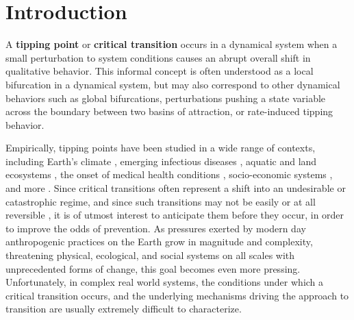 \section{Introduction}
\label{sec:intro}

A \textbf{tipping point} or \textbf{critical transition} occurs in a dynamical system when a small perturbation to system conditions causes an abrupt overall shift in qualitative behavior. This informal concept is often understood as a local bifurcation in a dynamical system, but may also correspond to other dynamical behaviors such as global bifurcations, perturbations pushing a state variable across the boundary between two basins of attraction, or rate-induced tipping behavior. 

Empirically, tipping points have been studied in a wide range of contexts, including 
%
Earth's climate \cite{lentonTippingElementsEarth2008, dakosSlowingEarlyWarning2008a}, 
%
emerging infectious diseases \cite{brettDynamicalFootprintsEnable2020}, 
%
aquatic and land ecosystems \cite{schefferCatastrophicShiftsEcosystems2001a, carpenterRisingVarianceLeading2006}, 
%
the onset of medical health conditions \cite{mcsharryPredictionEpilepticSeizures2003, venegasSelforganizedPatchinessAsthma2005}, 
%
socio-economic systems \cite{ginkelClimateChangeInduced2020}, 
%
and more \cite{georgeEarlyWarningSignals2021, schefferEarlywarningSignalsCritical2009a}. 
%
%
Since critical transitions often represent a shift into an undesirable or catastrophic regime, and since such transitions may not be easily or at all reversible \cite{albrichClimateChangeCauses2020, chenImperfectVaccineHysteresis2019, lucariniThermodynamicAnalysisSnowball2010}, it is of utmost interest to anticipate them before they occur, in order to improve the odds of prevention. 
%
As pressures exerted by modern day anthropogenic practices on the Earth grow in magnitude and complexity, threatening physical, ecological, and social systems on all scales with unprecedented forms of change, this goal becomes even more pressing. 
%
Unfortunately, in complex real world systems, the conditions under which a critical transition occurs, and the underlying mechanisms driving the approach to transition are usually extremely difficult to characterize.

